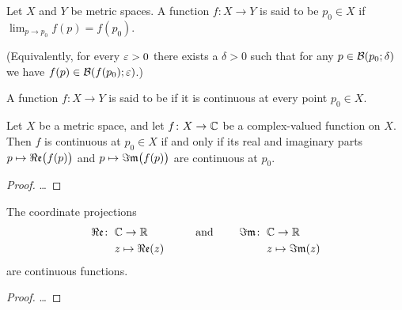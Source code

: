 %

\begin{definition}[Continuity]
  \label{def:continuous}
  Let $X$ and $Y$ be metric spaces.
  A function $f \colon X \to Y$ is said to be 
  $p_0 \in X$ if $\lim_{p \to p_0} f(p) = f(p_0)$.

  (Equivalently, for every $\varepsilon > 0$ there
  exists a $\delta > 0$ such that for any $p \in \mathcal{B}(p_0; \delta)$
  we have $f(p) \in \mathcal{B}(f(p_0); \varepsilon)$.)

  A function $f \colon X \to Y$ is said to be  if
  it is continuous at every point $p_0 \in X$.
\end{definition}

\begin{lemma}
  \label{lem:continuous_complex}
  Let $X$ be a metric space, and let $f \colon X \to \mathbb{C}$ be
  a complex-valued function on $X$. Then $f$ is continuous
  at $p_0 \in X$ if and only if its real and imaginary parts
  $p \mapsto \Re\mathfrak{e} \big( f(p) \big)$
  and $p \mapsto \Im\mathfrak{m} \big( f(p) \big)$ are continuous at $p_0$.
\end{lemma}
\begin{proof}
  \ldots
\end{proof}

\begin{corollary}
  \label{cor:coordinate_continuous}
  The coordinate projections
  \begin{align*}
    \Re\mathfrak{e} \colon \; & \mathbb{C} \to \mathbb{R}
    \qquad\qquad \text{ and } & \quad
    \Im\mathfrak{m} \colon \; & \mathbb{C} \to \mathbb{R} \\
    & z \mapsto \Re\mathfrak{e}(z) &
    & z \mapsto \Im\mathfrak{m}(z)
  \end{align*}
  are continuous functions.
\end{corollary}
\begin{proof}
  \ldots
\end{proof}

